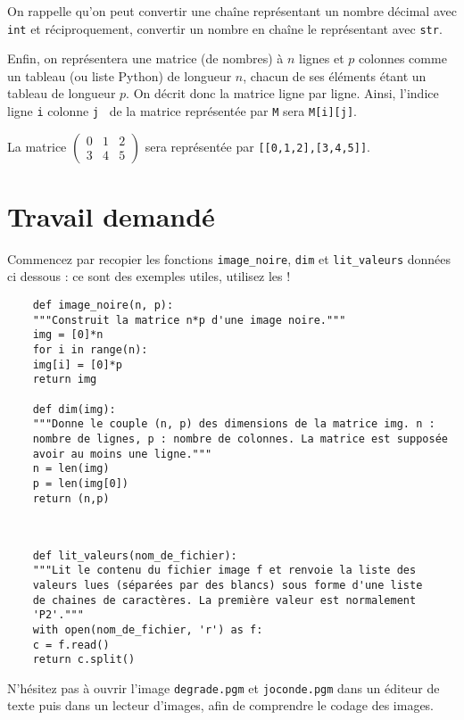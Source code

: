 \bigskip On rappelle qu'on peut convertir une chaîne représentant un nombre
décimal avec \texttt{int} et réciproquement, convertir un nombre en chaîne
le représentant avec \texttt{str}.

\bigskip Enfin, on représentera une matrice (de nombres) à $n$ lignes et $p$ colonnes comme un tableau (ou liste Python) de longueur $n$, chacun de ses éléments étant un tableau de longueur $p$. On décrit donc la matrice ligne par ligne. 
Ainsi, l'indice \og ligne \texttt{i} colonne \texttt{j} \fg\ de la matrice représentée par \texttt{M} sera \texttt{M[i][j]}.
\begin{exemple}
	La matrice $\begin{pmatrix} 0&1&2 \\ 3&4&5 \end{pmatrix}$ sera représentée par \texttt{[[0,1,2],[3,4,5]]}.
\end{exemple}

\section*{Travail demandé}

Commencez par recopier les fonctions  \texttt{image\_noire}, \texttt{dim} et  \texttt{lit\_valeurs} données ci dessous : ce sont des exemples utiles, utilisez les ! 

\begin{lstlisting}
	def image_noire(n, p):
	"""Construit la matrice n*p d'une image noire."""
	img = [0]*n
	for i in range(n):
	img[i] = [0]*p
	return img
	
	def dim(img):
	"""Donne le couple (n, p) des dimensions de la matrice img. n :
	nombre de lignes, p : nombre de colonnes. La matrice est supposée
	avoir au moins une ligne."""
	n = len(img)
	p = len(img[0])
	return (n,p)
	
\end{lstlisting}

\eject \begin{lstlisting}
	
	def lit_valeurs(nom_de_fichier):
	"""Lit le contenu du fichier image f et renvoie la liste des
	valeurs lues (séparées par des blancs) sous forme d'une liste
	de chaines de caractères. La première valeur est normalement
	'P2'."""
	with open(nom_de_fichier, 'r') as f:
	c = f.read()
	return c.split()
\end{lstlisting}


N'hésitez pas à ouvrir l'image \texttt{degrade.pgm} et \texttt{joconde.pgm} dans un éditeur de texte puis dans un lecteur d'images, afin de comprendre le codage des images.


